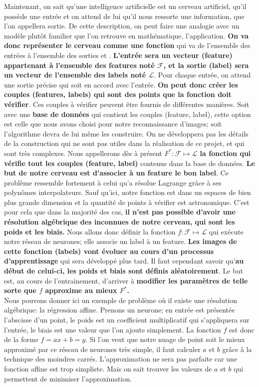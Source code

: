 \documentclass[12pt,a4paper]{extarticle}
\begin{document}
Maintenant, on sait qu'une intelligence artificielle est un cerveau artificiel, qu'il possède une entrée et on attend de lui qu'il nous ressorte une information, que l'on appellera sortie. De cette description, on peut faire une analogie avec un modèle plutôt familier que l'on retrouve en mathématique, l'application. \textbf{On va donc représenter le cerveau comme une fonction} qui va de l'ensemble des entrées à l'ensemble des sorties \cite{s4a} et \cite{3b1b}. \textbf{L'entrée sera un vecteur (feature) appartenant à l'ensemble des features noté $\mathcal F$, et la sortie (label) sera un vecteur de l'ensemble des labels noté $\mathcal L$}. Pour chaque entrée, on attend une sortie précise qui soit en accord avec l'entrée.\textbf{ On peut donc créer les couples (features, labels) qui sont des points que la fonction doit vérifier}. Ces couples à vérifier peuvent être fournis de différentes manières. Soit avec une \textbf{base de données} qui contient les couples (feature, label), cette option est celle que nous avons choisi pour notre reconnaissance d'images; soit l'algorithme devra de lui même les construire. On ne développera pas les détails de la construction qui ne sont pas utiles dans la réalisation de ce projet, et qui sont très complexes. 
Nous appellerons dès à présent \textbf{$F^*:\mathcal F \mapsto \mathcal L$ la fonction qui vérifie tout les couples (feature, label)} contenus dans la base de données. \textbf{Le but de notre cerveau est d'associer à un feature le bon label}. Ce problème ressemble fortement à celui qu'a résolue Lagrange grâce à ses polynômes interpolateurs. Sauf qu'ici, notre fonction est dans un espaces de bien plus grande dimension et la quantité de points à vérifier est astronomique. C'est pour cela que dans la majorité des cas, \textbf{il n'est pas possible d'avoir une résolution algébrique des inconnues de notre cerveau, qui sont les poids et les biais.} Nous allons donc définir la fonction $f:\mathcal F \mapsto \mathcal L$ qui exécute notre réseau de neurones; elle associe un label à un feature. \textbf{Les images de cette fonction (labels) vont évoluer au cours d'un processus d'apprentissage} qui sera développé plus tard. Il faut cependant savoir qu'\textbf{au début de celui-ci, les poids et biais sont définis aléatoirement}. Le but est, au cours de l'entrainement, d'arriver à \textbf{modifier les paramètres de telle sorte que $f$ approxime au mieux  $F^*$.} \\

Nous pouvons donner ici un exemple de problème où il existe une résolution algébrique: la régression affine. Prenons un neurone; en entrée est présentée l'abscisse d'un point, le poids est un coefficient multiplicatif qui s'appliquera sur l'entrée, le biais est une valeur que l'on ajoute simplement. La fonction $f$ est donc de la forme $f=ax+b=y$. Si l'on veut que notre nuage de point soit le mieux approximé par ce réseau de neurones très simple, il faut calculer $a$ et $b$ grâce à la technique des moindres carrés. L'approximation ne sera pas parfaite car une fonction affine est trop simpliste. Mais on sait trouver les valeurs de $a$ et $b$ qui permettent de minimiser l'approximation.
\end{document}
